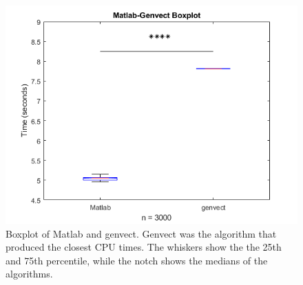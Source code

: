 \documentclass[sigconf]{acmart}
\begin{document}
\begin{figure}[h]
  \centering
  \includegraphics[width=\linewidth]{graphs/boxplot.png}
  \caption{Boxplot of Matlab and genvect. Genvect was the algorithm that produced the closest CPU times. The whiskers show the the 25th and 75th percentile, while the notch shows the medians of the algorithms.}
  \label{boxplot}
\end{figure}

\pagebreak
%


\end{document}
